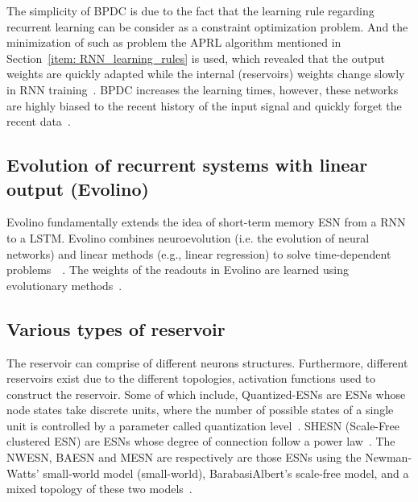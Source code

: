 \documentclass{WitsPhysicsReport}
\begin{document}
The simplicity of BPDC is due to the fact that the learning rule regarding recurrent learning can be consider as a constraint optimization problem. And the minimization of such as problem the APRL algorithm mentioned in Section~\ref{item: RNN_learning_rules} is used, which revealed that the output weights are quickly adapted while the internal (reservoirs) weights change slowly in RNN training~\cite{lukovsevivcius2009reservoir,Schaetti2015}. BPDC increases the learning times, however, these networks are highly biased to the recent history of the input signal and quickly forget the recent data~\cite{Schaetti2015}.




\subsection{Evolution of recurrent systems with linear output (Evolino)}
\label{sec:Evolution_Of_Recurrent_Systems_With_Linear_Output_(Evolino)}


Evolino fundamentally extends the idea of short-term memory ESN from a RNN to a LSTM. Evolino combines neuroevolution (i.e. the evolution of neural networks) and linear methods (e.g., linear regression) to solve time-dependent problems~~\cite{melandriintroduction}. The weights of the readouts in Evolino are learned using evolutionary methods~\cite{lukovsevivcius2009reservoir}. 
 

\subsection{Various types of reservoir}
\label{sec:other_types_of_reservoir}
The reservoir can comprise of different neurons structures. Furthermore, different reservoirs exist due to the different topologies, activation functions used to construct the reservoir. 
Some of which include,  Quantized-ESNs are ESNs whose node states take discrete units, where the number of possible states of a single unit is controlled by a parameter called quantization
level~\cite{schrauwen2009computational}. SHESN (Scale-Free clustered ESN) are ESNs whose degree of connection follow a power law~\cite{Schaetti2015}. The NWESN, BAESN and MESN are respectively are those ESNs using the Newman-Watts' small-world model (small-world), BarabasiAlbert's scale-free model, and a mixed topology of these two models~\cite{cui2012architecture, Schaetti2015}. 
\end{document}
